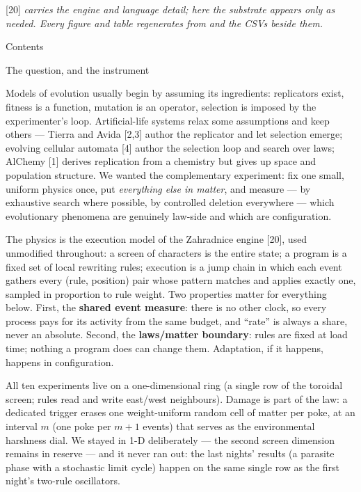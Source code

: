 \medskip
{} [20] {\it carries the engine and language detail; here
the substrate appears only as needed. Every figure and table
regenerates from}  {\it and the
CSVs beside them.}

\bigskip
{\nonum\notoc\sec Contents}
\maketoc
\bigskip

\sec The question, and the instrument

Models of evolution usually begin by assuming its ingredients:
replicators exist, fitness is a function, mutation is an operator,
selection is imposed by the experimenter's loop. Artificial-life
systems relax some assumptions and keep others --- Tierra and Avida
[2,3] author the replicator and let selection emerge; evolving
cellular automata [4] author the selection loop and search over
laws; AlChemy [1] derives replication from a chemistry but gives up
space and population structure. We wanted the complementary
experiment: fix one small, uniform physics once, put {\it
everything else in matter}, and measure --- by exhaustive search
where possible, by controlled deletion everywhere --- which
evolutionary phenomena are genuinely law-side and which are
configuration.

The physics is the execution model of the Zahradnice engine [20],
used unmodified throughout: a screen of characters is the entire
state; a program is a fixed set of local rewriting rules; execution
is a jump chain in which each event gathers every (rule, position)
pair whose pattern matches and applies exactly one, sampled in
proportion to rule weight. Two properties matter for everything
below. First, the {\bf shared event measure}: there is no other
clock, so every process pays for its activity from the same budget,
and “rate” is always a share, never an absolute. Second, the {\bf
laws/matter boundary}: rules are fixed at load time; nothing a
program does can change them. Adaptation, if it happens, happens in
configuration.

All ten experiments live on a one-dimensional ring (a single row of
the toroidal screen; rules read and write east/west neighbours).
Damage is part of the law: a dedicated trigger erases one
weight-uniform random cell of matter per poke, at an interval $m$
(one poke per $m{+}1$ events) that serves as the environmental
harshness dial. We stayed in 1-D deliberately --- the second screen
dimension remains in reserve --- and it never ran out: the last
nights' results (a parasite phase with a stochastic limit cycle)
happen on the same single row as the first night's two-rule
oscillators.

